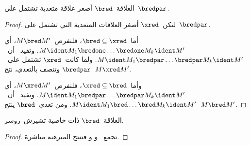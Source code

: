 \documentclass[../../../include/open-logic-section]{subfiles}
\begin{document}
\begin{lem}
  العلاقة~$\bred$ أصغر علاقة متعدية تشتمل على~$\bredpar$.
\end{lem}

\begin{proof}
  لتكن~$\xred$ أصغر العلاقات المتعدية التي تشتمل على~$\bredpar$.

  أما~$\bred \subseteq \xred$، فلنفرض~$M \bred M'$، أي
  $M \ident M_1 \bredone \dots \bredone M_k \ident M'$.
  وتفيد~ أن~$M \ident M_1 \bredpar \dots \bredpar M_k \ident M'$.
  ولما كانت~$\xred$ تشتمل على~$\bredpar$ وتتصف بالتعدي، نتج~$M \xred M'$.

  وأما~$\xred \subseteq \bred$، فلنفرض~$M \xred M'$، أي
  $M \ident M_1 \bredpar \dots \bredpar M_k \ident M'$.
  وتفيد~ أن~$M \ident M_1 \bred \dots \bred M_k \ident M'$.
  ومن تعدي~$\bred$ ينتج~$M \bred M'$.
\end{proof}

\begin{thm}
  العلاقة~$\bred$ ذات خاصية تشيرش--روسر.
\end{thm}

\begin{proof}
  تجمع~ و و
  فتنتج المبرهنة مباشرة.
\end{proof}
\end{document}
